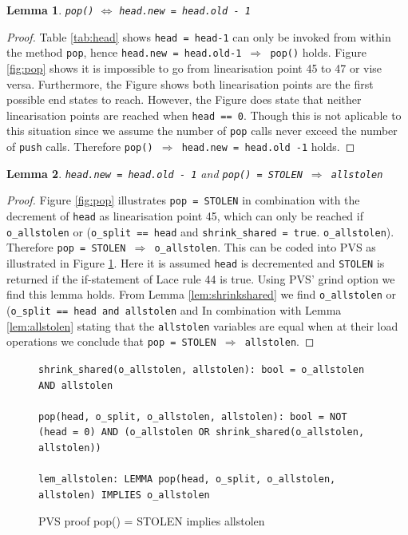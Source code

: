 \documentclass{sig-alternate-br}
\newtheorem{lemma}{Lemma}
\begin{document}
\begin{lemma}
	\texttt{pop()} $\iff$ \texttt{head.new = head.old - 1}
\end{lemma}
\begin{proof}
	Table \ref{tab:head} shows \texttt{head = head-1} can only be invoked from within the method \texttt{pop}, hence \texttt{head.new = head.old-1 $\Rightarrow$ pop()} holds.
	Figure \ref{fig:pop} shows it is impossible to go from linearisation point 45 to 47 or vise versa. Furthermore, the Figure shows both linearisation points are the first possible end states to reach. However, the Figure does state that neither linearisation points are reached when \texttt{head == 0}. Though this is not aplicable to this situation since we assume the number of \texttt{pop} calls never exceed the number of \texttt{push} calls. Therefore \texttt{pop() $\Rightarrow$ head.new = head.old -1} holds.
\end{proof}



\begin{lemma}
	\texttt{head.new = head.old - 1} and \texttt{pop() = STOLEN $\Rightarrow$ \texttt{allstolen}}
	\label{lem:popstolen}
\end{lemma}
\begin{proof}
	Figure \ref{fig:pop} illustrates \texttt{pop = STOLEN} in combination with the decrement of \texttt{head} as linearisation point 45, which can only be reached if \texttt{o\_allstolen} or (\texttt{o\_split == head} and \texttt{shrink\_shared = true}.
	\texttt{o\_allstolen}). Therefore \texttt{pop = STOLEN $\Rightarrow$ o\_allstolen}. This can be coded into PVS as illustrated in Figure \ref{pvs:popallstolen}. Here it is assumed \texttt{head} is decremented and \texttt{STOLEN} is returned if the if-statement of Lace rule 44 is true. Using PVS' grind option we find this lemma holds. From Lemma \ref{lem:shrinkshared} we find \texttt{o\_allstolen} or (\texttt{o\_split == head and allstolen} and
	In combination with Lemma \ref{lem:allstolen} stating that the \texttt{allstolen} variables are equal when at their load operations we conclude that \texttt{pop = STOLEN $\Rightarrow$ allstolen}.
\end{proof}
\begin{figure}[h]
	\texttt{shrink\_shared(o\_allstolen, allstolen): bool = o\_allstolen AND allstolen}\\\\
	\texttt{pop(head, o\_split, o\_allstolen, allstolen): bool = NOT (head = 0) AND (o\_allstolen OR shrink\_shared(o\_allstolen, allstolen))}\\\\
	\texttt{lem\_allstolen: LEMMA pop(head, o\_split, o\_allstolen, allstolen) IMPLIES o\_allstolen}
	\caption{PVS proof pop() = STOLEN implies allstolen}
	\label{pvs:popallstolen}
\end{figure}
\end{document}
